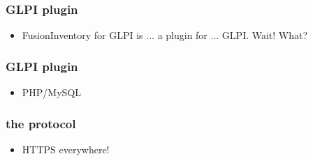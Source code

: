 %
%
\begin{frame}
\frametitle{GLPI plugin}
%
\begin{itemize}
\item FusionInventory for GLPI is ... a plugin for ... GLPI. Wait! What? 
%
\end{itemize}
\end{frame}

\begin{frame}
\frametitle{GLPI plugin}
%
\begin{itemize}
\item PHP/MySQL
%
\end{itemize}
\end{frame}

\begin{frame}
\frametitle{the protocol}
%
\begin{itemize}
\item HTTPS everywhere! 
%
\end{itemize}
\end{frame}



